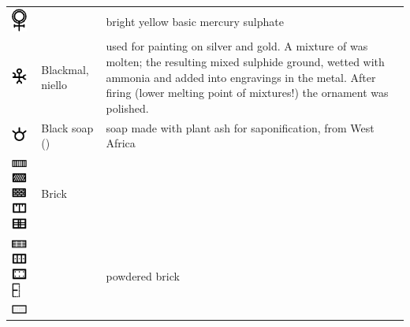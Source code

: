 \documentclass[british,final,landscape]{scrartcl}
\begin{document}
\begin{refsection}
\begin{supertabular}{p{0.3\textwidth}p{0.34\textwidth}p{0.34\textwidth}}
   \includegraphics[width=5mm]{Mixtures/BezoardicumVenereum} &  & bright yellow basic mercury sulphate  \\
   \includegraphics[width=5mm]{Mixtures/Blackmal} & Blackmal, niello & used for painting on silver and gold. A mixture of  was molten; the resulting mixed sulphide ground, wetted with ammonia and added into engravings in the metal. After firing (lower melting point of mixtures!) the ornament was polished. \\
   \includegraphics[width=5mm]{Mixtures/BlackSoap} & Black soap () & soap made with plant ash for saponification, from West Africa \\
   \includegraphics[width=5mm]{Mixtures/Brick} \includegraphics[width=5mm]{Mixtures/Brick2} \includegraphics[width=5mm]{Mixtures/Brick3} \includegraphics[width=5mm]{Mixtures/Brick4} \includegraphics[width=5mm]{Mixtures/Brick5} & Brick & \\
   \includegraphics[width=5mm]{Mixtures/PowderedBrick} \includegraphics[width=5mm]{Mixtures/PowderedBrick2} \includegraphics[width=5mm]{Mixtures/PowderedBrick3} \includegraphics[height=5mm]{Mixtures/PowderedBrick4} \includegraphics[width=5mm]{Mixtures/LaterCibratus} &  & powdered brick\\

\end{supertabular}
\end{refsection}
\end{document}
